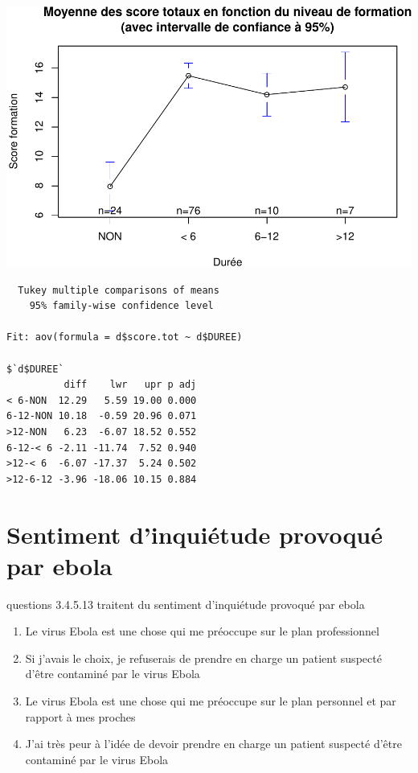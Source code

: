 \documentclass[]{article}
\begin{document}
\includegraphics{analyse_files/figure-latex/unnamed-chunk-19-1.pdf}

\begin{verbatim}
  Tukey multiple comparisons of means
    95% family-wise confidence level

Fit: aov(formula = d$score.tot ~ d$DUREE)

$`d$DUREE`
          diff    lwr   upr p adj
< 6-NON  12.29   5.59 19.00 0.000
6-12-NON 10.18  -0.59 20.96 0.071
>12-NON   6.23  -6.07 18.52 0.552
6-12-< 6 -2.11 -11.74  7.52 0.940
>12-< 6  -6.07 -17.37  5.24 0.502
>12-6-12 -3.96 -18.06 10.15 0.884
\end{verbatim}

\section{Sentiment d'inquiétude provoqué par
ebola}\label{sentiment-dinquietude-provoque-par-ebola}

questions 3.4.5.13 traitent du sentiment d'inquiétude provoqué par ebola

\begin{enumerate}
\def\labelenumi{\arabic{enumi}.}
\setcounter{enumi}{2}
\itemsep1pt\parskip0pt
\item
  Le virus Ebola est une chose qui me préoccupe sur le plan
  professionnel
\item
  Si j'avais le choix, je refuserais de prendre en charge un patient
  suspecté d'être contaminé par le virus Ebola
\item
  Le virus Ebola est une chose qui me préoccupe sur le plan personnel et
  par rapport à mes proches
\item
  J'ai très peur à l'idée de devoir prendre en charge un patient
  suspecté d'être contaminé par le virus Ebola
\end{enumerate}
\end{document}
